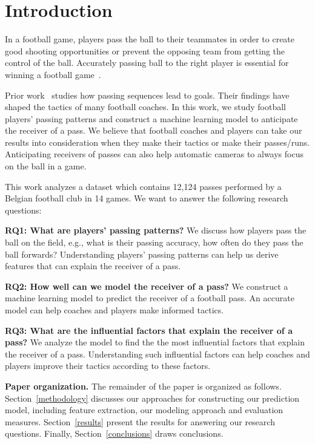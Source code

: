 \section{Introduction} \label{intro}
In a football game, players pass the ball to their teammates in order to create good shooting opportunities or prevent the opposing team from getting the control of the ball.
Accurately passing ball to the right player is essential for winning a football game~\cite{Ali2011Measuring,Hughes2005Analysis}.

Prior work~\cite{reep1968skill,Hughes2005Analysis} studies how passing sequences lead to goals. Their findings have shaped the tactics of many football coaches.
In this work, we study football players' passing patterns and construct a machine learning model to anticipate the receiver of a pass.
We believe that football coaches and players can take our results into consideration when they make their tactics or make their passes/runs. 
Anticipating receivers of passes can also help automatic cameras to always focus on the ball in a game.

This work analyzes a dataset which contains 12,124 passes performed by a Belgian football club in 14 games. We want to answer the following research questions: 

\begin{description}
	\item \textbf{RQ1: What are players' passing patterns?}
	We discuss how players pass the ball on the field, e.g., what is their passing accuracy, how often do they pass the ball forwards?
	Understanding players' passing patterns can help us derive features that can explain the receiver of a pass. 
	
	\item \textbf{RQ2: How well can we model the receiver of a pass?}
	We construct a machine learning model to predict the receiver of a football pass. 
	An accurate model can help coaches and players make informed tactics.
	
	\item \textbf{RQ3: What are the influential factors that explain the receiver of a pass?}
	We analyze the model to find the the most influential factors that explain the receiver of a pass. Understanding such influential factors can help coaches and players improve their tactics according to these factors.
\end{description}

\textbf{Paper organization.}
The remainder of the paper is organized as follows.
Section~\ref{methodology} discusses our approaches for constructing our prediction model, including feature extraction, our modeling approach and evaluation measures.
Section~\ref{results} present the results for answering our research questions.
Finally, Section~\ref{conclusions} draws conclusions.

